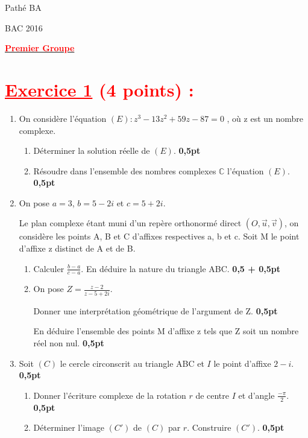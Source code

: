\documentclass[12pt]{article}
\begin{document}
\begin{minipage}{0.8\textwidth}
	Pathé BA                          
\end{minipage}
\begin{minipage}{0.8\textwidth}
	BAC 2016
\end{minipage}

\begin{center}
\textbf{{\underline{\textcolor{red}{Premier Groupe}}}}
\end{center}

\section*{\textcolor{red}{\underline{Exercice 1} (4 points) :}}
\begin{enumerate}
	\item On considère l’équation $(E): z^{3}-13z^{2}+59z-87=0$ , où z est un nombre complexe.
	\begin{enumerate}
		\item Déterminer la solution réelle de $(E)$.\textbf{ 0,5pt}
		\item Résoudre dans l’ensemble des nombres complexes $\mathbb{C}$ l’équation $(E)$.\textbf{ 0,5pt}
	\end{enumerate}
	\item On pose $a = 3$, $b = 5 - 2i$ et $c = 5 + 2i$.
	
			Le plan complexe étant muni d’un repère orthonormé direct $( O, \vec{u} ,\vec{v} )$, on considère les points A, B et C d’affixes respectives a, b et c. Soit M le point d’affixe z distinct de A et de B.
	\begin{enumerate}
		\item Calculer $\frac{b-a}{c-a}$. En déduire la nature du triangle ABC. \textbf{ 0,5 + 0,5pt}
		\item On pose $Z=\frac{z-2}{z-5+2i}.$
		
		Donner une interprétation géométrique de l’argument de Z.\textbf{ 0,5pt}
		
		En déduire l’ensemble des points M d’affixe z tels que Z soit un nombre réel non nul.\textbf{ 0,5pt}
  \end{enumerate}
   \item Soit $(C)$ le cercle circonscrit au triangle ABC et $I$ le point d’affixe $2 - i$.\textbf{ 0,5pt}
   \begin{enumerate}
     \item Donner l’écriture complexe de la rotation $r$ de centre $I$ et d’angle $\frac{-\pi}{2}$.\textbf{ 0,5pt}
     \item Déterminer l’image $(C')$ de $(C)$ par $r$. Construire $(C')$.\textbf{ 0,5pt}
   \end{enumerate}
\end{enumerate}
\end{document}
